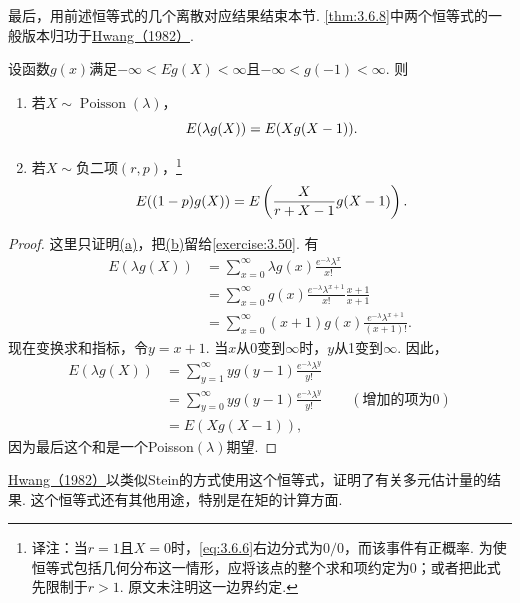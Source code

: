 最后，用前述恒等式的几个离散对应结果结束本节. \autoref{thm:3.6.8}中两个恒等式的一般版本归功于\hyperref[bib:source174]{Hwang（1982）}.

\begin{theorem}[Hwang]\label{thm:3.6.8}
设函数$g(x)$满足$-\infty<Eg(X)<\infty$且$-\infty<g(-1)<\infty$. 则
\begin{enumerate}[label=\alph*.]
\item{}\label{itm:thm:3.6.8:a} 若$X\sim\operatorname{Poisson}(\lambda)$，
\begin{equation}\label{eq:3.6.5}\index{SI0544@泊松}
E(\lambda g(X))=E(Xg(X-1)).
\end{equation}
\item{}\label{itm:thm:3.6.8:b} 若$X\sim\text{负二项}(r,p)$，\footnote{译注：当$r=1$且$X=0$时，\eqref{eq:3.6.6}右边分式为$0/0$，而该事件有正概率. 为使恒等式包括几何分布这一情形，应将该点的整个求和项约定为0；或者把此式先限制于$r>1$. 原文未注明这一边界约定.}
\begin{equation}\label{eq:3.6.6}\index{SI0543@负二项}
E((1-p)g(X))=E\left(\frac X{r+X-1}g(X-1)\right).
\end{equation}
\end{enumerate}
\end{theorem}

\begin{proof}
这里只证明\hyperref[itm:thm:3.6.8:a]{(a)}，把\hyperref[itm:thm:3.6.8:b]{(b)}留给\autoref{exercise:3.50}. 有
\begin{align*}
E(\lambda g(X))&=\sum_{x=0}^\infty\lambda g(x)\frac{e^{-\lambda}\lambda^x}{x!}\\
&=\sum_{x=0}^\infty g(x)\frac{e^{-\lambda}\lambda^{x+1}}{x!}\frac{x+1}{x+1}\\
&=\sum_{x=0}^\infty(x+1)g(x)\frac{e^{-\lambda}\lambda^{x+1}}{(x+1)!}.
\end{align*}
现在变换求和指标，令$y=x+1$. 当$x$从0变到$\infty$时，$y$从1变到$\infty$. 因此，
\begin{align*}
E(\lambda g(X))&=\sum_{y=1}^\infty yg(y-1)\frac{e^{-\lambda}\lambda^y}{y!}\\
&=\sum_{y=0}^\infty yg(y-1)\frac{e^{-\lambda}\lambda^y}{y!}\qquad(\text{增加的项为0})\\
&=E(Xg(X-1)),
\end{align*}
因为最后这个和是一个Poisson$(\lambda)$期望.
\end{proof}
\hyperref[bib:source174]{Hwang（1982）}以类似Stein的方式使用这个恒等式，证明了有关多元估计量的结果. 这个恒等式还有其他用途，特别是在矩的计算方面.

